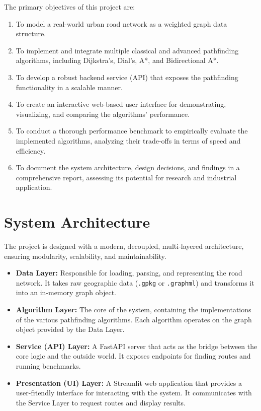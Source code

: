 \documentclass[12pt, a4paper]{report}
\begin{document}
The primary objectives of this project are:
\begin{enumerate}
    \item To model a real-world urban road network as a weighted graph data structure.
    \item To implement and integrate multiple classical and advanced pathfinding algorithms, including Dijkstra's, Dial's, A*, and Bidirectional A*.
    \item To develop a robust backend service (API) that exposes the pathfinding functionality in a scalable manner.
    \item To create an interactive web-based user interface for demonstrating, visualizing, and comparing the algorithms' performance.
    \item To conduct a thorough performance benchmark to empirically evaluate the implemented algorithms, analyzing their trade-offs in terms of speed and efficiency.
    \item To document the system architecture, design decisions, and findings in a comprehensive report, assessing its potential for research and industrial application.
\end{enumerate}

\section{System Architecture}

The project is designed with a modern, decoupled, multi-layered architecture, ensuring modularity, scalability, and maintainability.
\begin{itemize}
    \item \textbf{Data Layer:} Responsible for loading, parsing, and representing the road network. It takes raw geographic data (\texttt{.gpkg} or \texttt{.graphml}) and transforms it into an in-memory graph object.
    \item \textbf{Algorithm Layer:} The core of the system, containing the implementations of the various pathfinding algorithms. Each algorithm operates on the graph object provided by the Data Layer.
    \item \textbf{Service (API) Layer:} A FastAPI server that acts as the bridge between the core logic and the outside world. It exposes endpoints for finding routes and running benchmarks.
    \item \textbf{Presentation (UI) Layer:} A Streamlit web application that provides a user-friendly interface for interacting with the system. It communicates with the Service Layer to request routes and display results.
\end{itemize}
\end{document}
